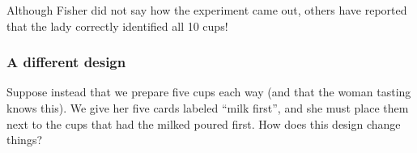Although Fisher did not say how the experiment came out, others have reported
that the lady correctly identified all 10 cups!
\cite{salsburg}


\subsubsection{A different design}

Suppose instead that we prepare five cups each way (and that the woman tasting
knows this).  We give her five cards labeled ``milk first'', and she must place 
them next to the cups that had the milked poured first.  How does this 
design change things?

\begin{knitrout}
\end{knitrout}





